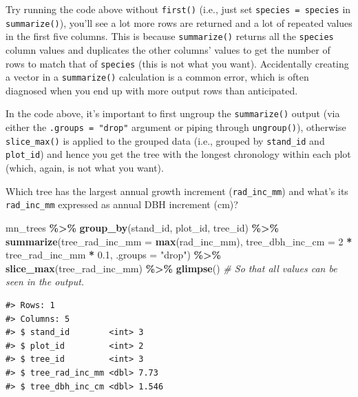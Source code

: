 \documentclass[
  11pt,
]{krantz}
\newenvironment{Shaded}{\begin{snugshade}}{\end{snugshade}}
\newcommand{\CommentTok}[1]{\textcolor[rgb]{0.56,0.35,0.01}{\textit{#1}}}
\newcommand{\DataTypeTok}[1]{\textcolor[rgb]{0.13,0.29,0.53}{#1}}
\newcommand{\DecValTok}[1]{\textcolor[rgb]{0.00,0.00,0.81}{#1}}
\newcommand{\FloatTok}[1]{\textcolor[rgb]{0.00,0.00,0.81}{#1}}
\newcommand{\KeywordTok}[1]{\textcolor[rgb]{0.13,0.29,0.53}{\textbf{#1}}}
\newcommand{\NormalTok}[1]{#1}
\newcommand{\OperatorTok}[1]{\textcolor[rgb]{0.81,0.36,0.00}{\textbf{#1}}}
\newcommand{\StringTok}[1]{\textcolor[rgb]{0.31,0.60,0.02}{#1}}
\theoremstyle{definition}
\theoremstyle{definition}
\theoremstyle{definition}
\theoremstyle{definition}
\theoremstyle{remark}
\begin{document}
\label{page:vectorInSummarizeError} Try running the code above without \texttt{first()} (i.e., just set \texttt{species\ =\ species} in \texttt{summarize()}), you'll see a lot more rows are returned and a lot of repeated values in the first five columns. This is because \texttt{summarize()} returns all the \texttt{species} column values and duplicates the other columns' values to get the number of rows to match that of \texttt{species} (this is not what you want). Accidentally creating a vector in a \texttt{summarize()} calculation is a common error, which is often diagnosed when you end up with more output rows than anticipated.

In the code above, it's important to first ungroup the \texttt{summarize()} output (via either the \texttt{.groups\ =\ "drop"} argument or piping through \texttt{ungroup()}), otherwise \texttt{slice\_max()} is applied to the grouped data (i.e., grouped by \texttt{stand\_id} and \texttt{plot\_id}) and hence you get the tree with the longest chronology within each plot (which, again, is not what you want).

Which tree has the largest annual growth increment (\texttt{rad\_inc\_mm}) and what's its \texttt{rad\_inc\_mm} expressed as annual DBH increment (cm)?

\begin{Shaded}
\begin{Highlighting}[]
\NormalTok{mn\_trees }\OperatorTok{\%\textgreater{}\%}\StringTok{ }\KeywordTok{group\_by}\NormalTok{(stand\_id, plot\_id, tree\_id) }\OperatorTok{\%\textgreater{}\%}\StringTok{ }
\StringTok{  }\KeywordTok{summarize}\NormalTok{(}\DataTypeTok{tree\_rad\_inc\_mm =} \KeywordTok{max}\NormalTok{(rad\_inc\_mm), }
            \DataTypeTok{tree\_dbh\_inc\_cm =} \DecValTok{2} \OperatorTok{*}\StringTok{ }\NormalTok{tree\_rad\_inc\_mm }\OperatorTok{*}\StringTok{ }\FloatTok{0.1}\NormalTok{,}
            \DataTypeTok{.groups =} \StringTok{"drop"}\NormalTok{) }\OperatorTok{\%\textgreater{}\%}
\StringTok{  }\KeywordTok{slice\_max}\NormalTok{(tree\_rad\_inc\_mm) }\OperatorTok{\%\textgreater{}\%}\StringTok{ }
\StringTok{  }\KeywordTok{glimpse}\NormalTok{() }\CommentTok{\# So that all values can be seen in the output.}
\end{Highlighting}
\end{Shaded}

\begin{verbatim}
#> Rows: 1
#> Columns: 5
#> $ stand_id        <int> 3
#> $ plot_id         <int> 2
#> $ tree_id         <int> 3
#> $ tree_rad_inc_mm <dbl> 7.73
#> $ tree_dbh_inc_cm <dbl> 1.546
\end{verbatim}
\end{document}
